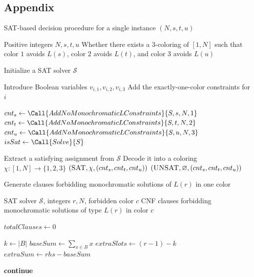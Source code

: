 \documentclass[twoside, 12pt]{article}
\begin{document}
\begin{thebibliography}{99}
\section{Appendix}

\begin{algorithm}[htbp]\scriptsize
\caption{SAT-based decision procedure for a single instance $(N,s,t,u)$}
\label{alg:solve_s3_instance}
\begin{algorithmic}[1]
\Require Positive integers $N,s,t,u$
\Ensure Whether there exists a $3$-coloring of $[1,N]$ such that color $1$ avoids $L(s)$, color $2$ avoids $L(t)$, and color $3$ avoids $L(u)$

\State Initialize a SAT solver $\mathcal{S}$

    \State Introduce Boolean variables $v_{i,1}, v_{i,2}, v_{i,3}$
    \State Add the exactly-one-color constraints for $i$
\EndFor

\State $cnt_s \gets \Call{AddNoMonochromaticLConstraints}{S, s, N, 1}$
\State $cnt_t \gets \Call{AddNoMonochromaticLConstraints}{S, t, N, 2}$
\State $cnt_u \gets \Call{AddNoMonochromaticLConstraints}{S, u, N, 3}$
\State $isSat \gets \Call{Solve}{S}$

    \State Extract a satisfying assignment from $\mathcal{S}$
    \State Decode it into a coloring $\chi:[1,N]\to\{1,2,3\}$
    \State \Return $(\textsc{SAT}, \chi, (cnt_s,cnt_t,cnt_u))$
\Else
    \State \Return $(\textsc{UNSAT}, \varnothing, (cnt_s,cnt_t,cnt_u))$
\EndIf
\end{algorithmic}
\end{algorithm}



\begin{algorithm}[htbp]\scriptsize
\caption{Generate clauses forbidding monochromatic solutions of $L(r)$ in one color}
\label{alg:add_no_mono_constraints}
\begin{algorithmic}[1]
\Require SAT solver $\mathcal{S}$, integers $r,N$, forbidden color $c$
\Ensure CNF clauses forbidding monochromatic solutions of type $L(r)$ in color $c$

\State $totalClauses \gets 0$

        \State $k \gets |B|$
        \State $baseSum \gets \sum_{x\in B} x$
        \State $extraSlots \gets (r-1)-k$
        \State $extraSum \gets rhs-baseSum$

            \State \textbf{continue}
        \EndIf


\end{algorithmic}
\end{algorithm}
\end{thebibliography}
\end{document}
